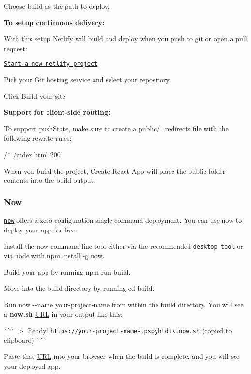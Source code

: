 Choose {\ttfamily build} as the path to deploy.

{\bfseries To setup continuous delivery\+:}

With this setup Netlify will build and deploy when you push to git or open a pull request\+:


\begin{DoxyEnumerate}
\item \href{https://app.netlify.com/signup}{\tt Start a new netlify project}
\item Pick your Git hosting service and select your repository
\item Click {\ttfamily Build your site}
\end{DoxyEnumerate}

{\bfseries Support for client-\/side routing\+:}

To support {\ttfamily push\+State}, make sure to create a {\ttfamily public/\+\_\+redirects} file with the following rewrite rules\+:


\begin{DoxyCode}
/*  /index.html  200
\end{DoxyCode}


When you build the project, Create React App will place the {\ttfamily public} folder contents into the build output.

\subsubsection*{Now}

\href{https://zeit.co/now}{\tt now} offers a zero-\/configuration single-\/command deployment. You can use {\ttfamily now} to deploy your app for free.


\begin{DoxyEnumerate}
\item Install the {\ttfamily now} command-\/line tool either via the recommended \href{https://zeit.co/download}{\tt desktop tool} or via node with {\ttfamily npm install -\/g now}.
\item Build your app by running {\ttfamily npm run build}.
\item Move into the build directory by running {\ttfamily cd build}.
\item Run {\ttfamily now -\/-\/name your-\/project-\/name} from within the build directory. You will see a {\bfseries now.\+sh} \mbox{\hyperlink{namespace_u_r_l}{U\+RL}} in your output like this\+:

\`{}\`{}\`{} $>$ Ready! \href{https://your-project-name-tpspyhtdtk.now.sh}{\tt https\+://your-\/project-\/name-\/tpspyhtdtk.\+now.\+sh} (copied to clipboard) \`{}\`{}\`{}

Paste that \mbox{\hyperlink{namespace_u_r_l}{U\+RL}} into your browser when the build is complete, and you will see your deployed app.
\end{DoxyEnumerate}

